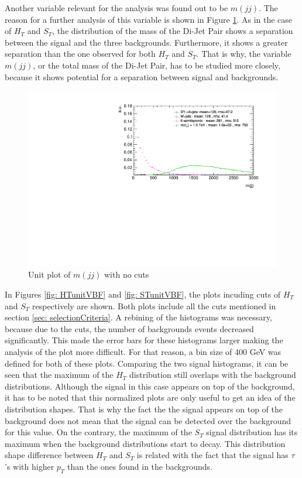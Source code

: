Another variable relevant for the analysis was found out to be $m(jj)$. The reason for a further analysis of this variable is shown in Figure \ref{fig: mjjUnitNC}. As in the case of $H_{T}$ and $S_{T}$, the distribution of the mass of the Di-Jet Pair shows a separation between the signal and the three backgrounds. Furthermore, it shows a greater separation than the one observed for both $H_{T}$ and $S_{T}$. That is why, the variable $m(jj)$, or the total mass of the Di-Jet Pair, has to be studied more closely, because it shows potential for a separation between signal and backgrounds.

\begin{figure}
\centering
\includegraphics[width=\linewidth]{Plots/mjj_unitNC.pdf}
\caption{Unit plot of $m(jj)$ with no cuts}
\label{fig: mjjUnitNC}
\end{figure}

In Figures \ref{fig: HTunitVBF} and \ref{fig: STunitVBF}, the plots incuding cuts of $H_{T}$ and $S_{T}$ respectively are shown. Both plots include all the cuts mentioned in section \ref{sec: selectionCriteria}. A rebining of the histograms was necessary, because due to the cuts, the number of backgrounds events decreased significantly. This made the error bars for these histograms larger making the analysis of the plot more difficult. For that reason, a bin size of 400 GeV was defined for both of these plots. Comparing the two signal histograms, it can be seen that the maximum of the $H_{T}$ distribution still overlaps with the background distributions. Although the signal in this case appears on top of the background, it has to be noted that this normalized plots are only useful to get an idea of the distribution shapes. That is why the fact the the signal appears on top of the background does not mean that the signal can be detected over the background for this value. On the contrary, the maximum of the $S_{T}$ signal distribution has its maximum when the background distributions start to decay. This distribution shape  difference between $H_{T}$ and $S_{T}$ is related with the fact that the signal has $\tau$'s with higher $p_{T}$ than the ones found in the backgrounds.


